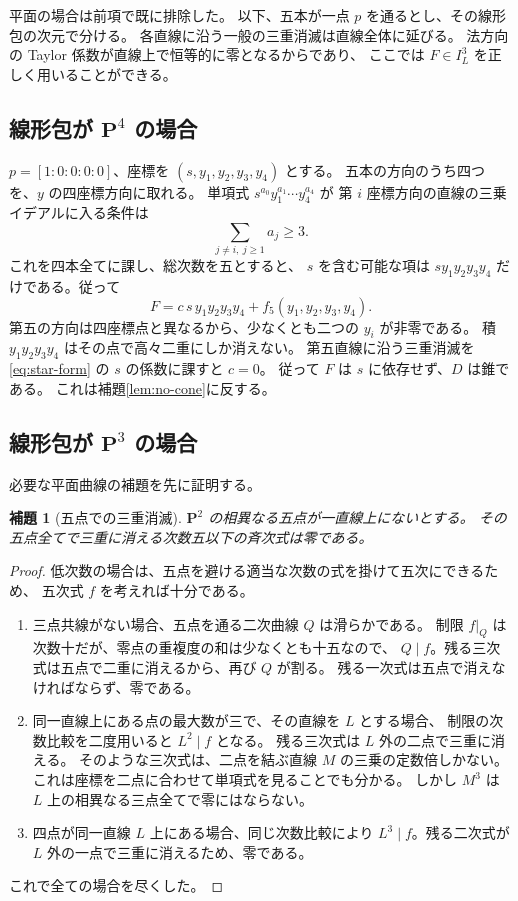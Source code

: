 \documentclass[11pt,a4paper]{ltjsarticle}
\newcommand{\PP}{\mathbf P}\renewcommand{\AA}{\mathbf A}
\newtheorem{lemma}[theorem]{補題}
\theoremstyle{remark}\newtheorem{remark}[theorem]{注意}
\begin{document}
平面の場合は前項で既に排除した。
以下、五本が一点 $p$ を通るとし、その線形包の次元で分ける。
各直線に沿う一般の三重消滅は直線全体に延びる。
法方向の Taylor 係数が直線上で恒等的に零となるからであり、
ここでは $F\in I_L^3$ を正しく用いることができる。

\subsection{線形包が \texorpdfstring{$\PP^4$}{P4} の場合}

$p=[1:0:0:0:0]$、座標を $(s,y_1,y_2,y_3,y_4)$ とする。
五本の方向のうち四つを、$y$ の四座標方向に取れる。
単項式 $s^{a_0}y_1^{a_1}\cdots y_4^{a_4}$ が
第 $i$ 座標方向の直線の三乗イデアルに入る条件は
\[
\sum_{j\ne i,\ j\ge1}a_j\ge3.
\]
これを四本全てに課し、総次数を五とすると、
$s$ を含む可能な項は $s y_1y_2y_3y_4$ だけである。従って
\begin{equation}\label{eq:star-form}
F=c\,s\,y_1y_2y_3y_4+f_5(y_1,y_2,y_3,y_4).
\end{equation}
第五の方向は四座標点と異なるから、少なくとも二つの $y_i$ が非零である。
積 $y_1y_2y_3y_4$ はその点で高々二重にしか消えない。
第五直線に沿う三重消滅を \eqref{eq:star-form} の $s$ の係数に課すと $c=0$。
従って $F$ は $s$ に依存せず、$D$ は錐である。
これは補題\ref{lem:no-cone}に反する。

\subsection{線形包が \texorpdfstring{$\PP^3$}{P3} の場合}

必要な平面曲線の補題を先に証明する。

\begin{lemma}[五点での三重消滅]\label{lem:five-triple}
$\PP^2$ の相異なる五点が一直線上にないとする。
その五点全てで三重に消える次数五以下の斉次式は零である。
\end{lemma}
\begin{proof}
低次数の場合は、五点を避ける適当な次数の式を掛けて五次にできるため、
五次式 $f$ を考えれば十分である。
\begin{enumerate}
\item 三点共線がない場合、五点を通る二次曲線 $Q$ は滑らかである。
制限 $f|_Q$ は次数十だが、零点の重複度の和は少なくとも十五なので、
$Q\mid f$。残る三次式は五点で二重に消えるから、再び $Q$ が割る。
残る一次式は五点で消えなければならず、零である。
\item 同一直線上にある点の最大数が三で、その直線を $L$ とする場合、
制限の次数比較を二度用いると $L^2\mid f$ となる。
残る三次式は $L$ 外の二点で三重に消える。
そのような三次式は、二点を結ぶ直線 $M$ の三乗の定数倍しかない。
これは座標を二点に合わせて単項式を見ることでも分かる。
しかし $M^3$ は $L$ 上の相異なる三点全てで零にはならない。
\item 四点が同一直線 $L$ 上にある場合、同じ次数比較により
$L^3\mid f$。残る二次式が $L$ 外の一点で三重に消えるため、零である。
\end{enumerate}
これで全ての場合を尽くした。
\end{proof}
\end{document}
